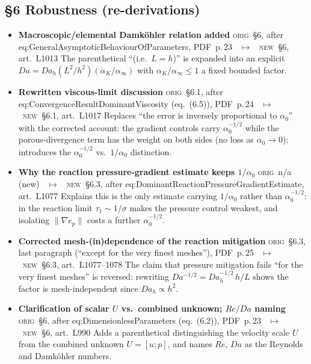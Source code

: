 \documentclass[11pt]{article}
\newcommand{\Orig}{\textcolor{origc}{\footnotesize\textsc{orig}}}
\newcommand{\New}{\textcolor{newc}{\footnotesize\textsc{new}}}
\newcommand{\code}[1]{\textcolor{newc}{\ttfamily\small #1}}
\newcommand{\pdfp}[1]{PDF~p.\,#1}
\newcommand{\artl}[1]{art.\ L#1}       %
\newcommand{\ch}[4]{%
  \item \textbf{#1}\newline
    {\footnotesize\Orig\ #2 \ \textcolor{locc}{$\longmapsto$} \ \New\ #3}\newline
    #4}
\begin{document}
\subsection{\S6 Robustness (re-derivations)}
\begin{itemize}
\ch{Macroscopic/elemental Damk\"ohler relation added}
   {\S6, after \code{eq:GeneralAsymptoticBehaviourOfParameters}, \pdfp{23}}
   {\S6, \artl{1013}}
   {The parenthetical ``(i.e.\ $L{=}h$)'' is expanded into an explicit
    $Da=Da_h(L^2/h^2)(\alpha_K/\alpha_\infty)$ with $\alpha_K/\alpha_\infty\le1$ a fixed bounded
    factor.}
\ch{Rewritten viscous-limit discussion}
   {\S6.1, after \code{eq:ConvergenceResultDominantViscosity} (eq.~(6.5)), \pdfp{24}}
   {\S6.1, \artl{1017}}
   {Replaces ``the error is inversely proportional to $\alpha_0$'' with the corrected account: the
    gradient controls carry $\alpha_0^{-1/2}$ while the porous-divergence term has the weight on both
    sides (no loss as $\alpha_0\to0$); introduces the $\alpha_0^{-1/2}$ vs.\ $1/\alpha_0$ distinction.}
\ch{Why the reaction pressure-gradient estimate keeps $1/\alpha_0$}
   {n/a (new)}
   {\S6.3, after \code{eq:DominantReactionPressureGradientEstimate}, \artl{1077}}
   {Explains this is the only estimate carrying $1/\alpha_0$ rather than $\alpha_0^{-1/2}$: in the
    reaction limit $\tau_1\!\sim\!1/\sigma$ makes the pressure control weakest, and isolating
    $\|\nabla e_p\|$ costs a further $\alpha_0^{-1/2}$.}
\ch{Corrected mesh-(in)dependence of the reaction mitigation}
   {\S6.3, last paragraph (``except for the very finest meshes''), \pdfp{25}}
   {\S6.3, \artl{1077}--1078}
   {The claim that pressure mitigation fails ``for the very finest meshes'' is reversed: rewriting
    $Da^{-1/2}=Da_h^{-1/2}\,h/L$ shows the factor is mesh-independent since $Da_h\propto h^2$.}
\ch{Clarification of scalar $U$ vs.\ combined unknown; $Re/Da$ naming}
   {\S6, after \code{eq:DimensionlessParameters} (eq.~(6.2)), \pdfp{23}}
   {\S6, \artl{990}}
   {Adds a parenthetical distinguishing the velocity scale $U$ from the combined unknown $U=[u;p]$,
    and names $Re$, $Da$ as the Reynolds and Damk\"ohler numbers.}
\end{itemize}
\end{document}
